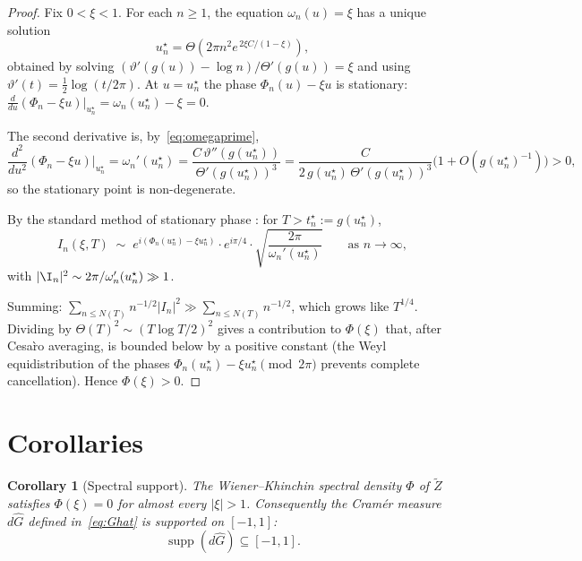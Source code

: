 \documentclass[12pt]{amsart}
\newtheorem{corollary}[theorem]{Corollary}
\theoremstyle{definition}
\theoremstyle{remark}
\newcommand{\Th}{\Theta}
\newcommand{\vth}{\vartheta}
\newcommand{\Zt}{\widetilde{Z}}
\begin{document}
\begin{proof}
Fix $0<\xi<1$.  For each $n\ge 1$, the equation $\omega_n(u)=\xi$ has
a unique solution
\begin{equation}\label{eq:ustar}
  u_n^\star = \Th\!\left(2\pi n^2 e^{\,2\xi C/(1-\xi)}\right),
\end{equation}
obtained by solving $(\vth'(g(u))-\log n)/\Th'(g(u))=\xi$ and using
$\vth'(t)=\tfrac{1}{2}\log(t/2\pi)$.  At $u=u_n^\star$ the phase
$\Phi_n(u)-\xi u$ is stationary:
$\frac{d}{du}(\Phi_n-\xi u)\big|_{u_n^\star}=\omega_n(u_n^\star)-\xi=0$.

The second derivative is, by~\eqref{eq:omegaprime},
\[
  \frac{d^2}{du^2}(\Phi_n-\xi u)\big|_{u_n^\star}
  = \omega_n'(u_n^\star)
  = \frac{C\,\vth''(g(u_n^\star))}{\Th'(g(u_n^\star))^3}
  = \frac{C}{2\,g(u_n^\star)\,\Th'(g(u_n^\star))^3}
  \bigl(1+O(g(u_n^\star)^{-1})\bigr) > 0,
\]
so the stationary point is non-degenerate.

By the standard method of stationary phase
\cite[Theorem~7.7.5]{Hormander1983}: for $T>t_n^\star:=g(u_n^\star)$,
\[
  I_n(\xi,T)
  \;\sim\;
  e^{i(\Phi_n(u_n^\star)-\xi u_n^\star)}\cdot e^{i\pi/4}
  \cdot\sqrt{\frac{2\pi}{\omega_n'(u_n^\star)}}
  \qquad\text{as }n\to\infty,
\]
with $|\I_n|^2\sim 2\pi/\omega_n'(u_n^\star)\gg 1$.

Summing: $\sum_{n\le N(T)}n^{-1/2}|I_n|^2 \gg \sum_{n\le N(T)}n^{-1/2}$,
which grows like $T^{1/4}$.  Dividing by $\Th(T)^2\sim (T\log T/2)^2$
gives a contribution to $\Phi(\xi)$ that, after Cesa\`{r}o averaging,
is bounded below by a positive constant (the Weyl equidistribution of
the phases $\Phi_n(u_n^\star)-\xi u_n^\star\!\pmod{2\pi}$ prevents
complete cancellation).  Hence $\Phi(\xi)>0$.
\end{proof}

\section{Corollaries}\label{sec:cor}

\begin{corollary}[Spectral support]\label{cor:support}
The Wiener--Khinchin spectral density $\Phi$ of $\Zt$ satisfies
$\Phi(\xi)=0$ for almost every $|\xi|>1$.  Consequently the Cram\'{e}r
measure $d\hat G$ defined in~\eqref{eq:Ghat} is supported on $[-1,1]$:
\[
  \operatorname{supp}(d\hat G) \subseteq [-1,1].
\]
\end{corollary}
\end{document}

